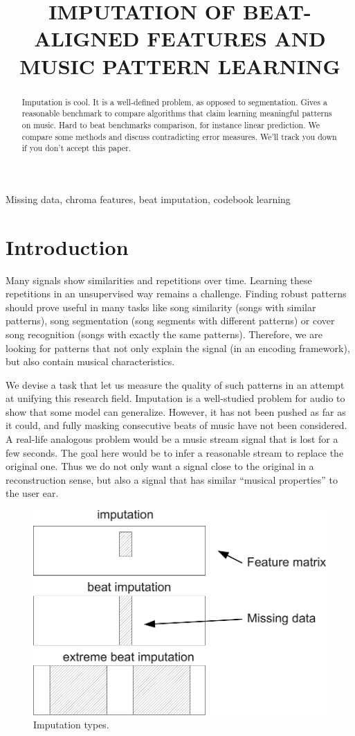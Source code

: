 \documentclass{article}
\title{IMPUTATION OF BEAT-ALIGNED FEATURES AND MUSIC PATTERN LEARNING}
\begin{document}
%
\maketitle
%
\begin{abstract}
Imputation is cool. It is a well-defined problem, as opposed to segmentation.
Gives a reasonable benchmark to compare algorithms that claim learning meaningful
patterns on music. Hard to beat benchmarks comparison, for instance linear
prediction. We compare some methods and discuss contradicting error measures. 
We'll track you down if you don't accept this paper.
\end{abstract}
%
\begin{keywords}
Missing data, chroma features, beat imputation, codebook learning
\end{keywords}
%
\section{Introduction}
\label{sec:intro}
Many signals show similarities and repetitions over time. Learning these repetitions
in an unsupervised way remains a challenge. Finding robust patterns should prove useful in
many tasks like song similarity (songs with similar patterns), song segmentation
(song segments with different patterns) or cover song recognition (songs with exactly
the same patterns).
Therefore, we are looking for patterns that not only explain the signal (in an encoding
framework), but also contain musical characteristics. 

We devise a task that let us measure
the quality of such patterns in an attempt at unifying this research field.
Imputation is a well-studied problem for audio to show that some model can generalize.
However, it has not been pushed as far as it could, and fully masking consecutive beats
of music have not been considered. A real-life analogous problem would be a music stream
signal that is lost for a few seconds. The goal here would be to infer a reasonable
stream to replace the original one. Thus we do not only want a signal close to the original
in a reconstruction sense, but also a signal that has similar ``musical properties'' to
the user ear.

\begin{figure}[t]
\begin{center}
\includegraphics[width=.7\columnwidth]{type_imputation}
\end{center}
\caption{Imputation types.
\label{fig:types}}
\end{figure}
\end{document}
